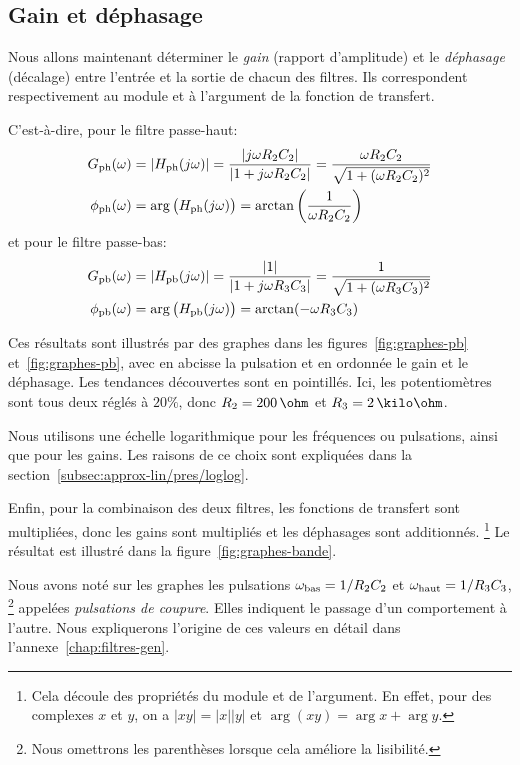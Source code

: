 \subsection{Gain et déphasage}

Nous allons maintenant déterminer
le \emph{gain} (rapport d'amplitude) et le  \emph{déphasage} (décalage)
entre l'entrée et la sortie de chacun des filtres.
Ils correspondent respectivement au module et à l'argument de la fonction de
transfert.

C'est-à-dire, pour le filtre passe-haut:
\begin{align}
    G_{\mathrm{ph}}(\omega) &= |H_{\mathrm{ph}}(j\omega)|
    = \frac{|j\omega R_2C_2|}{|1 + j\omega R_2C_2|}
    = \frac{\omega R_2C_2}{\sqrt{1+(\omega R_2C_2)^2}}\\
    \phi_{\mathrm{ph}}(\omega) &= \arg\big(H_{\mathrm{ph}}(j\omega)\big)
    = \arctan\left(\frac{1}{\omega R_2C_2}\right)
\end{align}
et pour le filtre passe-bas:
\begin{align}
    G_{\mathrm{pb}}(\omega) &= |H_{\mathrm{pb}}(j\omega)|
    = \frac{|1|}{|1 + j\omega R_3C_3|}
    = \frac{1}{\sqrt{1+(\omega R_3C_3)^2}}\\
    \phi_{\mathrm{pb}}(\omega) &= \arg\big(H_{\mathrm{pb}}(j\omega)\big)
    = \arctan(-\omega R_3C_3)
\end{align}

Ces résultats sont illustrés par des graphes dans
les figures~\ref{fig:graphes-pb} et~\ref{fig:graphes-pb},
avec en abcisse la pulsation
et en ordonnée le gain et le déphasage.
Les tendances découvertes sont en pointillés.
Ici, les potentiomètres sont tous deux réglés à $20\%$,
donc $R_2 = 200\,\ohm$ et $R_3 = 2\,\kilo\ohm$.

Nous utilisons une échelle logarithmique pour les fréquences
ou pulsations, ainsi que pour les gains.
Les raisons de ce choix sont expliquées dans
la section~\ref{subsec:approx-lin/pres/loglog}.

Enfin, pour la combinaison des deux filtres,
les fonctions de transfert sont multipliées,
donc les gains sont multipliés et les déphasages sont additionnés.%
\footnote{
    Cela découle des propriétés du module et de l'argument.
    En effet, pour des complexes $x$ et $y$,
    on a $|xy| = |x||y|$ et $\arg(xy) = \arg x + \arg y$.
}
Le résultat est illustré dans la figure~\ref{fig:graphes-bande}.

Nous avons noté sur les graphes les pulsations
$\omega_{\mathrm{bas}} = 1/R_2C_2$ et $\omega_{\mathrm{haut}}=1/R_3C_3$,%
\footnote{Nous omettrons les parenthèses lorsque cela améliore la lisibilité.}
appelées \emph{pulsations de coupure}.
Elles indiquent le passage d'un comportement à l'autre.
Nous expliquerons l'origine de ces valeurs en détail dans
l'annexe~\ref{chap:filtres-gen}.
